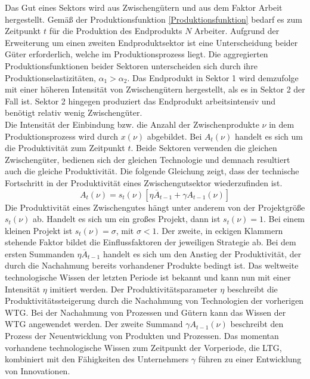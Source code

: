 Das Gut eines Sektors wird aus Zwischengütern und aus dem Faktor Arbeit hergestellt. Gemäß der Produktionsfunktion \eqref{Produktionsfunktion} bedarf es zum Zeitpunkt $t$ für die Produktion des Endprodukts $N$ Arbeiter. Aufgrund der Erweiterung um einen zweiten Endproduktsektor ist eine Unterscheidung beider Güter erforderlich, welche im Produktionsprozess liegt. Die aggregierten Produktionsfunktionen beider Sektoren unterscheiden sich durch ihre Produktionselastizitäten, $\alpha_1>\alpha_2$. Das Endprodukt in Sektor 1 wird demzufolge mit einer höheren Intensität von Zwischengütern hergestellt, als es in Sektor 2 der Fall ist. Sektor 2 hingegen produziert das Endprodukt arbeitsintensiv und benötigt relativ wenig Zwischengüter. \\
%
Die Intensität der Einbindung bzw. die Anzahl der Zwischenprodukte $\nu$ in dem Produktionsprozess wird durch $x(\nu)$ abgebildet. Bei $ A_t(\nu)$ handelt es sich um die Produktivität zum Zeitpunkt $t$. Beide Sektoren verwenden die gleichen Zwischengüter, bedienen sich der gleichen Technologie und demnach resultiert auch die gleiche Produktivität. Die folgende Gleichung zeigt, dass der technische Fortschritt in der Produktivität eines Zwischengutsektor wiederzufinden ist. 
%
	\begin{equation}
		A_t(\nu)=s_t(\nu)[\eta\overline{A}_{t-1}+\gamma A_{t-1}(\nu)]\label{Produktivitat}
	\end{equation}
%
Die Produktivität eines Zwischengutes hängt unter anderem von der Projektgröße $s_t(\nu)$ ab. Handelt es sich um ein großes Projekt, dann ist $s_t(\nu)=1$. Bei einem kleinen Projekt ist $s_t(\nu)=\sigma$, mit $\sigma<1$.
Der zweite, in eckigen Klammern stehende Faktor bildet die Einflussfaktoren der jeweiligen Strategie ab. Bei dem ersten Summanden $\eta\overline{A}_{t-1}$ handelt es sich um den Anstieg der Produktivität, der durch die Nachahmung bereits vorhandener Produkte bedingt ist. Das weltweite technologische Wissen der letzten Periode ist bekannt und kann nun mit einer Intensität $\eta$ imitiert werden. Der Produktivitätsparameter $\eta$ beschreibt die Produktivitätssteigerung durch die Nachahmung von Technologien der vorherigen WTG. Bei der Nachahmung von Prozessen und Gütern kann das Wissen der WTG angewendet werden. Der zweite Summand $\gamma A_{t-1}(\nu)$ beschreibt den Prozess der Neuentwicklung von Produkten und Prozessen. Das momentan vorhandene technologische Wissen zum Zeitpunkt der Vorperiode, die LTG, kombiniert mit den Fähigkeiten des Unternehmers $\gamma$ führen zu einer Entwicklung von Innovationen. \\
